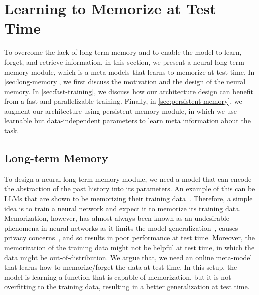 \documentclass{article}
\newcommand{\citep}{\parencite}
\begin{document}
\section{Learning to Memorize at Test Time}\label{sec:mem-module}
\lettrine[lines=3]{T}{}o overcome the lack of long-term memory and to enable the model to learn, forget, and retrieve information, in this section, we present a neural long-term memory module, which is a meta models that learns to memorize at test time. In \autoref{sec:long-memory}, we first discuss the motivation and the design of the neural memory.  In \autoref{sec:fast-training}, we discuss how our architecture design can benefit from a fast and parallelizable training. Finally, in \autoref{sec:persistent-memory}, we augment our architecture using persistent memory module, in which we use learnable but data-independent parameters to learn meta information about the task. 

\subsection{Long-term Memory}\label{sec:long-memory}
To design a neural long-term memory module, we need a model that can encode the abstraction of the past history into its parameters. An example of this can be LLMs that are shown to be memorizing their training data~\citep{staab2024beyond, schwarzschild2024rethinking, leybzon2024learning}. Therefore, a simple idea is to train a neural network and expect it to memorize its training data. Memorization, however, has almost always been known as an undesirable phenomena in neural networks as it limits the model generalization~\citep{bayat2024pitfalls}, causes privacy concerns~\citep{staab2024beyond}, and so results in poor performance at test time. Moreover, the memorization of the training data might not be helpful at test time, in which the data might be out-of-distribution. We argue that, we need an online meta-model that learns how to memorize/forget the data at test time. In this setup, the model is learning a function that is capable of memorization, but it is not overfitting to the training data, resulting in a better generalization at test time.    
\end{document}
